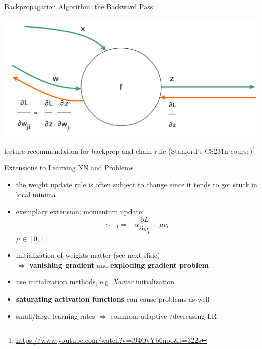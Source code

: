 \documentclass{beamer}
\begin{document}
\begin{frame}{Backpropagation Algorithm: the Backward Pass}
\begin{center}
\includegraphics[width=1\textwidth]{backprop2}
\end{center}
lecture recommendation for backprop and chain rule (Stanford's CS231n course)\footnote{\url{https://www.youtube.com/watch?v=i94OvYb6noo&t=322s}}
\end{frame}


\begin{frame}{Extensions to Learning NN and Problems}

\begin{itemize}
\item the weight update rule is often subject to change since it tends to get stuck in local minima
\item exemplary extension; momentum update:
\begin{equation}
v_{t+1} = - \alpha \frac{\partial L}{\partial w_t} + \mu v_t
\end{equation} $\mu \in [0,1]$

\item initialization of weights matter (see next slide)\\
$\Rightarrow$ \textbf{vanishing gradient} and \textbf{exploding gradient problem}
\item use initialization methods, e.g. \emph{Xavier} initialization
\item \textbf{saturating activation functions} can cause problems as well
\item small/large learning rates $\Rightarrow$ common: adaptive /decreasing LR
\end{itemize}
\end{frame}
\end{document}
